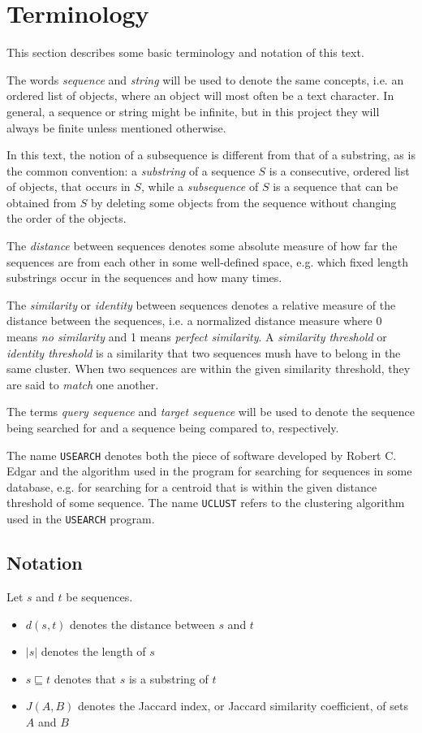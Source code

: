 \section{Terminology}

This section describes some basic terminology and notation of this text.

The words \emph{sequence} and \emph{string} will be used to denote the same
concepts, i.e. an ordered list of objects, where an object will most often be a
text character. In general, a sequence or string might be infinite, but in this
project they will always be finite unless mentioned otherwise.

In this text, the notion of a subsequence is different from that of a
substring, as is the common convention: a \emph{substring} of a sequence $S$ is
a consecutive, ordered list of objects, that occurs in $S$, while a
\emph{subsequence} of $S$ is a sequence that can be obtained from $S$ by
deleting some objects from the sequence without changing the order of the
objects.

The \emph{distance} between sequences denotes some absolute measure of how far
the sequences are from each other in some well-defined space, e.g. which fixed
length substrings occur in the sequences and how many times.

The \emph{similarity} or \emph{identity} between sequences denotes a relative
measure of the distance between the sequences, i.e. a normalized distance
measure where 0 means \emph{no similarity} and 1 means \emph{perfect
similarity}. A \emph{similarity threshold} or \emph{identity threshold} is a
similarity that two sequences mush have to belong in the same cluster.  When
two sequences are within the given similarity threshold, they are said to
\emph{match} one another.

The terms \emph{query sequence} and \emph{target sequence} will be used to
denote the sequence being searched for and a sequence being compared to,
respectively.

The name \texttt{USEARCH} denotes both the piece of software developed by
Robert C. Edgar and the algorithm used in the program for searching for
sequences in some database, e.g. for searching for a centroid that is within
the given distance threshold of some sequence. The name \texttt{UCLUST} refers
to the clustering algorithm used in the \texttt{USEARCH} program.


\subsection{Notation}
Let $s$ and $t$ be sequences.
\begin{itemize}
  \item $d(s,t)$ denotes the distance between $s$ and $t$
  \item $|s|$ denotes the length of $s$
  \item $s \sqsubseteq t$ denotes that $s$ is a substring of $t$
  \item $J(A,B)$ denotes the Jaccard index, or Jaccard similarity coefficient,
    of sets $A$ and $B$
\end{itemize}
